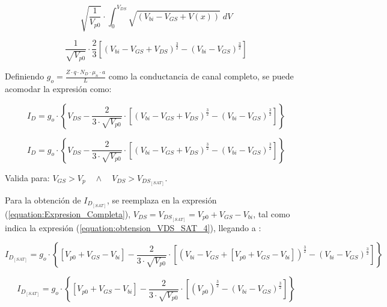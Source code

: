 \documentclass[a4paper]{article}
\begin{document}
\begin{equation}
	\sqrt{ \frac{1}{V_{p0}}} \cdot \int_0^{V_{DS}} \sqrt{ (V_{bi} - V_{GS} + V(x))} \; dV
\end{equation}

\begin{equation}
	 \frac{1}{\sqrt{V_{p0}}} \cdot \frac{2}{3} \left[ (V_{bi} - V_{GS} + V_{DS} )^{\frac{3}{2}} - ( V_{bi} - V_{GS})^{\frac{3}{2}} \right]
\end{equation}


Definiendo $g_o = \frac{Z\cdot q \cdot N_D \cdot \mu_n \cdot a}{L}$ como la conductancia de canal completo, se puede acomodar la expresión como:


\begin{equation}
	I_D = g_o \cdot	\left\{ V_{DS}  - \frac{2}{3 \cdot \sqrt{V_{p0}}} \cdot \left[ (V_{bi} - V_{GS} + V_{DS} )^{\frac{3}{2}} - ( V_{bi} - V_{GS})^{\frac{3}{2}} \right]\right\} 
\end{equation}


\begin{tcolorbox}[colback=black!5!white, colframe=black!75!black, title=Expresión de la corriente ID (modelo completo en función de los parámetros de control y del circuito externo)]


		\begin{equation} \label{equation:Expresion_Completa}
				I_D = g_o \cdot	\left\{ V_{DS}  - \frac{2}{3 \cdot \sqrt{V_{p0}}} \cdot \left[ (V_{bi} - V_{GS} + V_{DS} )^{\frac{3}{2}} - ( V_{bi} - V_{GS})^{\frac{3}{2}} \right] \right\} 
		\end{equation}
	
	Valida para: $ V_{GS} > V_p \quad \wedge \quad V_{DS} > V_{DS_{[SAT]}}$.
\end{tcolorbox}


Para la obtención de $I_{D_{[SAT]}}$, se reemplaza en la expresión (\ref{equation:Expresion_Completa}), $ V_{DS} = V_{DS_{[SAT]}} =  V_{p0} + V_{GS} - V_{bi}$, tal como indica la expresión (\ref{equation:obtension_VDS_SAT_4}), llegando a : 
	
	\begin{equation} \label{equation:ID_SAT_COMPLETA}
		I_{D_{[SAT]}} = g_o \cdot	\left\{[V_{p0} + V_{GS} -  V_{bi}]  - \frac{2}{3 \cdot \sqrt{V_{p0}}} \cdot \left[ (V_{bi} - V_{GS} + [V_{p0} + V_{GS} -  V_{bi}] )^{\frac{3}{2}} - ( V_{bi} - V_{GS})^{\frac{3}{2}} \right] \right\} 
	\end{equation}

	\begin{equation} \label{equation:ID_SAT_COMPLETA_2}
		I_{D_{[SAT]}} = g_o \cdot	\left\{[V_{p0} + V_{GS} -  V_{bi}]  - \frac{2}{3 \cdot \sqrt{V_{p0}}} \cdot \left[( V_{p0} )^{\frac{3}{2}} - ( V_{bi} - V_{GS})^{\frac{3}{2}} \right] \right\} 
	\end{equation}
\end{document}
